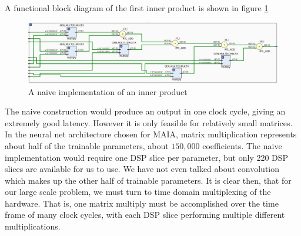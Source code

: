 A functional block diagram of the first inner product is shown in figure \ref{fig:naive_inner_product}

\begin{figure}[H]
\includegraphics[width=\textwidth]{innerproduct.png}
\caption{A naive implementation of an inner product}
\label{fig:naive_inner_product}
\centering
\end{figure}

The naive construction would produce an output in one clock cycle, giving an extremely good latency.  However it is only feasible for relatively small matrices.  In the neural net architecture chosen for MAIA, matrix multiplication represents about half of the trainable parameters, about $150,000$ coefficients.  The naive implementation would require one DSP slice per parameter, but only 220 DSP slices are available for us to use.  We have not even talked about convolution which makes up the other half of trainable parameters.  It is clear then, that for our large scale problem, we must turn to time domain multiplexing of the hardware.  That is, one matrix multiply must be accomplished over the time frame of many clock cycles, with each DSP slice performing multiple different multiplications.







